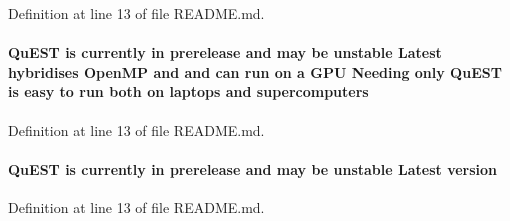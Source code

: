 Definition at line 13 of file README.md.\hypertarget{README_8md_a1a0088f6c565daaa48409371f6c5c36c}{
\paragraph[{supercomputers}]{\setlength{\rightskip}{0pt plus 5cm}QuEST is currently in prerelease and may be unstable Latest hybridises OpenMP and and can run on a GPU Needing only QuEST is easy to run both on laptops and {\bf supercomputers}}\hfill}
\label{README_8md_a1a0088f6c565daaa48409371f6c5c36c}


Definition at line 13 of file README.md.\hypertarget{README_8md_a94df19ae37ab2d673ea00c5d31754e61}{
\paragraph[{version}]{\setlength{\rightskip}{0pt plus 5cm}QuEST is currently in prerelease and may be unstable Latest {\bf version}}\hfill}
\label{README_8md_a94df19ae37ab2d673ea00c5d31754e61}


Definition at line 13 of file README.md.